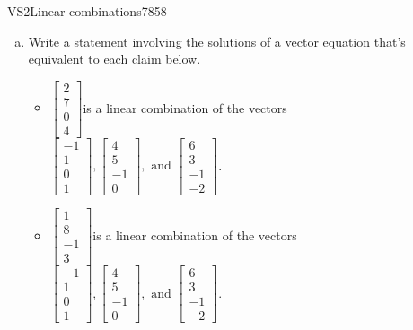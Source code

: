 \begin{exercise}{VS2}{Linear combinations}{7858} 
\begin{exerciseStatement} 

\begin{enumerate}[(a)]
\item  

 Write a statement involving the solutions of a vector equation that's equivalent to each claim below. 

 

\begin{itemize}
\item  

 \(\left[\begin{array}{c}
2 \\
7 \\
0 \\
4
\end{array}\right]\)is a linear combination of the vectors \(\left[\begin{array}{c}
-1 \\
1 \\
0 \\
1
\end{array}\right] , \left[\begin{array}{c}
4 \\
5 \\
-1 \\
0
\end{array}\right] , \text{ and } \left[\begin{array}{c}
6 \\
3 \\
-1 \\
-2
\end{array}\right]\). 

 
\item  

 \(\left[\begin{array}{c}
1 \\
8 \\
-1 \\
3
\end{array}\right]\)is a linear combination of the vectors \(\left[\begin{array}{c}
-1 \\
1 \\
0 \\
1
\end{array}\right] , \left[\begin{array}{c}
4 \\
5 \\
-1 \\
0
\end{array}\right] , \text{ and } \left[\begin{array}{c}
6 \\
3 \\
-1 \\
-2
\end{array}\right]\). 


\end{itemize}
\end{enumerate}
\end{exerciseStatement}
\end{exercise}
